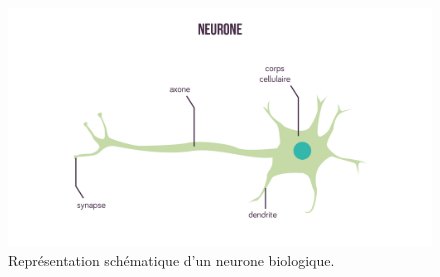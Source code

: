 \begin{figure}
  \centering
  \includegraphics[width=14cm]{./Chapitre2/figures/neuroneBio.png}
  \caption{Représentation schématique d'un neurone biologique.}
  \label{fig:neuroneBio}
\end{figure}
